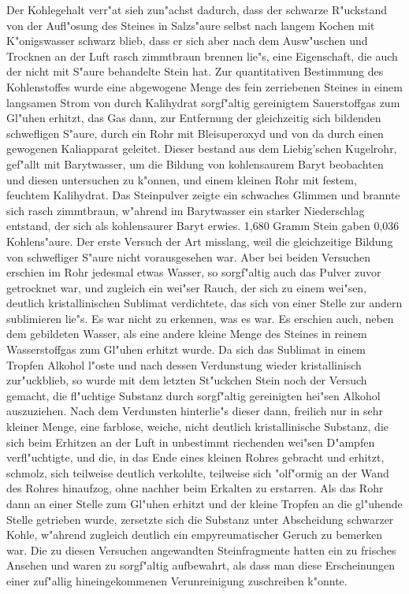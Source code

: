 \documentclass[a4paper, 11pt, oneside]{article}
\begin{document}
Der Kohlegehalt verr"at sieh zun"achst dadurch, dass der schwarze R"uckstand von der Aufl"osung des Steines in Salzs"aure selbst nach langem Kochen mit K"onigswasser schwarz blieb, dass er sich aber nach dem Ausw"uschen und Trocknen an der Luft rasch zimmtbraun brennen lie"s, eine Eigenschaft, die auch der nicht mit S"aure behandelte Stein hat. Zur quantitativen Bestimmung des Kohlenstoffes wurde eine abgewogene Menge des fein zerriebenen Steines in einem langsamen Strom von durch Kalihydrat sorgf"altig gereinigtem Sauerstoffgas zum Gl"uhen erhitzt, das Gas dann, zur Entfernung der gleichzeitig sich bildenden schwefligen S"aure, durch ein Rohr mit Bleisuperoxyd und von da durch einen gewogenen Kaliapparat geleitet. Dieser bestand aus dem Liebig’schen Kugelrohr, gef"allt mit Barytwasser, um die Bildung von kohlensaurem Baryt beobachten und diesen untersuchen zu k"onnen, und einem kleinen Rohr mit festem, feuchtem Kalihydrat. Das Steinpulver zeigte ein schwaches Glimmen und brannte sich rasch zimmtbraun, w"ahrend im Barytwasser ein starker Niederschlag entstand, der sich als kohlensaurer Baryt erwies. 1,680 Gramm Stein gaben 0,036 Kohlens"aure. Der erste Versuch der Art misslang, weil die gleichzeitige Bildung von schwefliger S"aure nicht vorausgesehen war. Aber bei beiden Versuchen erschien im Rohr jedesmal etwas Wasser, so sorgf"altig auch das Pulver zuvor getrocknet war, und zugleich ein wei"ser Rauch, der sich zu einem wei"sen, deutlich kristallinischen Sublimat verdichtete, das sich von einer Stelle zur andern sublimieren lie"s. Es war nicht zu erkennen, was es war. Es erschien auch, neben dem gebildeten Wasser, als eine andere kleine Menge des Steines in reinem Wasserstoffgas zum Gl"uhen erhitzt wurde. Da sich das Sublimat in einem Tropfen Alkohol l"oste und nach dessen Verdunstung wieder kristallinisch zur"uckblieb, so wurde mit dem letzten St"uckchen Stein noch der Versuch gemacht, die fl"uchtige Substanz durch sorgf"altig gereinigten hei"sen Alkohol auszuziehen. Nach dem Verdunsten hinterlie"s dieser dann, freilich nur in sehr kleiner Menge, eine farblose, weiche, nicht deutlich kristallinische Substanz, die sich beim Erhitzen an der Luft in unbestimmt riechenden wei"sen D"ampfen verfl"uchtigte, und die, in das Ende eines kleinen Rohres gebracht und erhitzt, schmolz, sich teilweise deutlich verkohlte, teilweise sich "olf"ormig an der Wand des Rohres hinaufzog, ohne nachher beim Erkalten zu erstarren. Als das Rohr dann an einer Stelle zum Gl"uhen erhitzt und der kleine Tropfen an die gl"uhende Stelle getrieben wurde, zersetzte sich die Substanz unter Abscheidung schwarzer Kohle, w"ahrend zugleich deutlich ein empyreumatischer Geruch zu bemerken war. Die zu diesen Versuchen angewandten Steinfragmente hatten ein zu frisches Ansehen und waren zu sorgf"altig aufbewahrt, als dass man diese Erscheinungen einer zuf"allig hineingekommenen Verunreinigung zuschreiben k"onnte.
\end{document}
